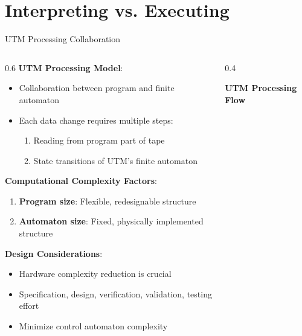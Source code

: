 \documentclass[aspectratio=169]{beamer}
\newcommand{\concept}[1]{\textbf{\color{darkblue}#1}}
\begin{document}
\section{Interpreting vs. Executing}

\begin{frame}{UTM Processing Collaboration}
\begin{columns}
\begin{column}{0.6\textwidth}
\concept{UTM Processing Model}:
\begin{itemize}
\item Collaboration between program and finite automaton
\item Each data change requires multiple steps:
\begin{enumerate}
\item Reading from program part of tape
\item State transitions of UTM's finite automaton
\end{enumerate}
\end{itemize}

\vspace{0.3cm}
\concept{Computational Complexity Factors}:
\begin{enumerate}
\item \textbf{Program size}: Flexible, redesignable structure
\item \textbf{Automaton size}: Fixed, physically implemented structure
\end{enumerate}

\vspace{0.3cm}
\concept{Design Considerations}:
\begin{itemize}
\item Hardware complexity reduction is crucial
\item Specification, design, verification, validation, testing effort
\item Minimize control automaton complexity
\end{itemize}
\end{column}
\begin{column}{0.4\textwidth}
\begin{center}
\textbf{UTM Processing Flow}
\vspace{0.3cm}

\end{center}
\end{column}
\end{columns}
\end{frame}
\end{document}

